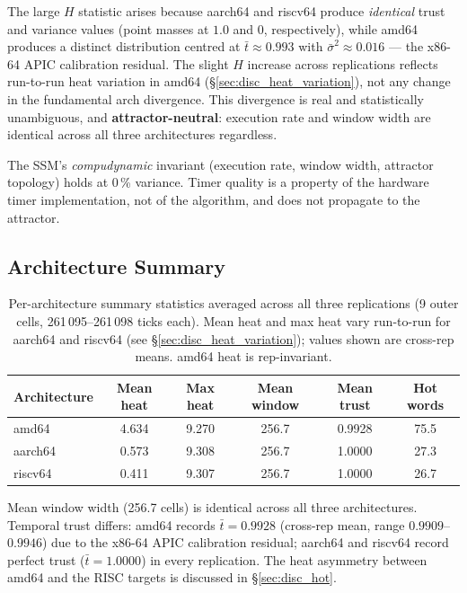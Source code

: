 \documentclass[10pt,a4paper]{article}
\begin{document}
The large $H$ statistic arises because aarch64 and riscv64 produce
\emph{identical} trust and variance values (point masses at $1.0$ and $0$,
respectively), while amd64 produces a distinct distribution centred at
$\bar{t}\approx0.993$ with $\bar{\sigma}^2\approx0.016$ --- the x86-64 APIC
calibration residual.  The slight $H$ increase across replications reflects
run-to-run heat variation in amd64 (§\ref{sec:disc_heat_variation}), not any
change in the fundamental arch divergence.  This divergence is real and
statistically unambiguous, and \textbf{attractor-neutral}: execution rate and
window width are identical across all three architectures regardless.

The SSM's \emph{compudynamic} invariant (execution rate, window width, attractor
topology) holds at 0\,\% variance.  Timer quality is a property of the hardware
timer implementation, not of the algorithm, and does not propagate to the
attractor.

\subsection{Architecture Summary}

\begin{table}[h!]
\centering
\caption{Per-architecture summary statistics averaged across all three replications
  (9 outer cells, 261\,095--261\,098 ticks each).  Mean heat and max heat vary
  run-to-run for aarch64 and riscv64 (see \S\ref{sec:disc_heat_variation});
  values shown are cross-rep means.  amd64 heat is rep-invariant.}
\label{tab:summary}
\begin{tabular}{lSSSSS}
\toprule
{Architecture} &
  {Mean heat} & {Max heat} &
  {Mean window} &
  {Mean trust} &
  {Hot words} \\
\midrule
amd64   & 4.634 & 9.270 & 256.7 & 0.9928 & 75.5 \\
aarch64 & 0.573 & 9.308 & 256.7 & 1.0000 & 27.3 \\
riscv64 & 0.411 & 9.307 & 256.7 & 1.0000 & 26.7 \\
\bottomrule
\end{tabular}
\end{table}

Mean window width (256.7 cells) is identical across all three architectures.
Temporal trust differs: amd64 records $\bar{t}=0.9928$ (cross-rep mean,
range $0.9909$--$0.9946$) due to the x86-64 APIC calibration residual;
aarch64 and riscv64 record perfect trust ($\bar{t}=1.0000$) in every
replication.  The heat asymmetry between amd64 and the RISC targets
is discussed in \S\ref{sec:disc_hot}.
\end{document}
